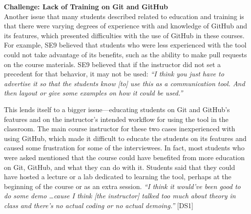 
\textbf{Challenge: Lack of Training on Git and GitHub} \\
Another issue that many students described related to education and training is that there were varying degrees of experience with and knowledge of GitHub and its features, which presented difficulties with the use of GitHub in these courses. For example, SE9 believed that students who were less experienced with the tool could not take advantage of its benefits, such as the ability to make pull requests on the course materials. SE9 believed that if the instructor did not set a precedent for that behavior, it may not be used: \textit{``I think you just have to advertise it so that the students know [to] use this as a communication tool. And then layout or give some examples on how it could be used.''}

This lends itself to a bigger issue---educating students on Git and GitHub's features and on the instructor's intended workflow for using the tool in the classroom. The main course instructor for these two cases inexperienced with using GitHub, which made it difficult to educate the students on its features and caused some frustration for some of the interviewees. In fact, most students who were asked mentioned that the course could have benefited from more education on Git, GitHub, and what they can do with it. Students said that they could have hosted a lecture or a lab dedicated to learning the tool, perhaps at the beginning of the course or as an extra session. \textit{``I think it would've been good to do some demo \ldots cause I think [the instructor] talked too much about theory in class and there's no actual coding or no actual demoing.''} [DS1]



